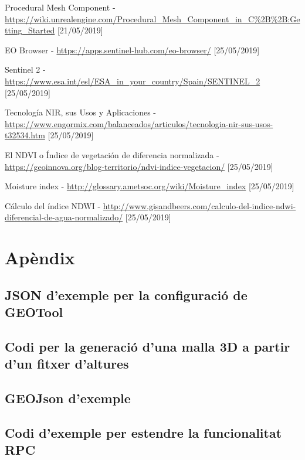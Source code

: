 \documentclass[10pt,a4paper,twocolumn,twoside]{article}
\begin{document}
\begin{thebibliography}{11}
Procedural Mesh Component - \url{https://wiki.unrealengine.com/Procedural_Mesh_Component_in_C%2B%2B:Getting_Started} [21/05/2019]

EO Browser - \url{https://apps.sentinel-hub.com/eo-browser/} [25/05/2019]

Sentinel 2 - \url{https://www.esa.int/esl/ESA_in_your_country/Spain/SENTINEL_2} [25/05/2019]

Tecnología NIR, sus Usos y Aplicaciones - \url{https://www.engormix.com/balanceados/articulos/tecnologia-nir-sus-usos-t32534.htm} [25/05/2019]

El NDVI o Índice de vegetación de diferencia normalizada - \url{https://geoinnova.org/blog-territorio/ndvi-indice-vegetacion/} [25/05/2019]

Moisture index - \url{http://glossary.ametsoc.org/wiki/Moisture_index} [25/05/2019]

Cálculo del índice NDWI - \url{http://www.gisandbeers.com/calculo-del-indice-ndwi-diferencial-de-agua-normalizado/} [25/05/2019]

\end{thebibliography}

\appendix
\section*{Apèndix}

\setcounter{section}{1}

\subsection{JSON d'exemple per la configuració de GEOTool}
\label{appendix:geotoolconfig}


\subsection{Codi per la generació d'una malla 3D a partir d'un fitxer d'altures}
\label{appendix:generateobj}


\subsection{GEOJson d'exemple}
\label{appendix:geojson}


\subsection{Codi d'exemple per estendre la funcionalitat RPC}
\label{appendix:extendrpc}
\end{document}

